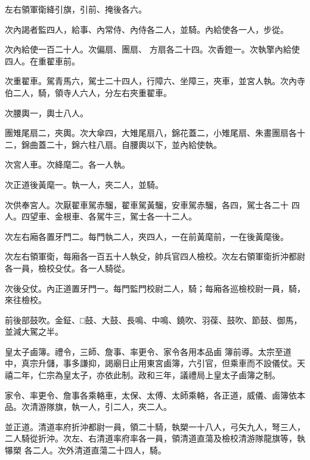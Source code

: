 \begin{pinyinscope}
 左右領軍衛絳引旗，引前、掩後各六。



 次內謁者監四人，給事、內常侍、內侍各二人，並騎。內給使各一人，步從。



 次內給使一百二十人。次偏扇、團扇、
 方扇各二十四。次香鐙一。次執擎內給使四人。在重翟車前。



 次重翟車。駕青馬六，駕士二十四人，行障六、坐障三，夾車，並宮人執。次內寺伯二人，騎，領寺人六人，分左右夾重翟車。



 次腰輿一，輿士八人。



 團雉尾扇二，夾輿。次大傘四，大雉尾扇八，錦花蓋二，小雉尾扇、朱畫團扇各十二，錦曲蓋二十，錦六柱八扇。自腰輿以下，並內給使執。



 次宮人車。次絳麾二。各一人執。



 次正道後黃麾一。執一人，夾二人，並騎。



 次供奉宮人。次厭翟車駕赤騮，翟車駕黃騮，安車駕赤騮，各四，駕士各二十
 四人。四望車、金根車、各駕牛三，駕士各一十二人。



 次左右廂各置牙門二。每門執二人，夾四人，一在前黃麾前，一在後黃麾後。



 次左右領軍衛，每廂各一百五十人執殳，帥兵官四人檢校。次左右領軍衛折沖都尉各一員，檢校殳仗。各一人騎從。



 次後殳仗。內正道置牙門一。每門監門校尉二人，騎；每廂各巡檢校尉一員，騎，來往檢校。



 前後部鼓吹。金鉦、□鼓、大鼓、長鳴、中鳴、鐃吹、羽葆、鼓吹、節鼓、御馬，並減大駕之半。



 皇太子鹵簿。禮令，三師、詹事、率更令、家令各用本品鹵
 簿前導。太宗至道中，真宗升儲，事多謙抑，謁廟日止用東宮鹵簿，六引官，但乘車而不設儀仗。天禧二年，仁宗為皇太子，亦依此制。政和三年，議禮局上皇太子鹵簿之制。



 家令、率更令、詹事各乘輅車，太保、太傅、太師乘輅，各正道，威儀、鹵簿依本品。次清游隊旗，執一人，引二人，夾二人。



 並正道。清道率府折沖都尉一員，領二十騎，執槊一十八人，弓矢九人，弩三人，二人騎從折沖。次左、右清道率府率各一員，領清道直蕩及檢校清游隊龍旗等，執犦槊
 各二人。次外清道直蕩二十四人，騎。




\end{pinyinscope}
